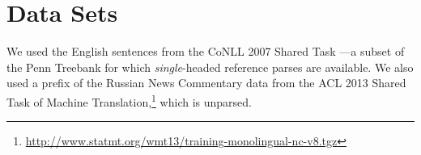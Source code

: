 \documentclass[a4paper,11pt]{article}
\newcommand{\Note}[4][]{\todo[author=#2,color=#3,fancyline,#1]{#4}}
\newcommand{\noteJE}[2][]{\Note[size=\small,#1]{JE}{green!40}{#2}}
\newcommand{\NoteJE}[2][]{\noteJE[inline,#1]{#2}}
\begin{document}




\section{Data Sets}
We used the English sentences from the CoNLL 2007 Shared Task \cite{CONLL-SHARED-2007}---a subset of the Penn Treebank for which {\em single}-headed reference parses are available. 
We also used a prefix of the Russian News Commentary data from the ACL 2013 Shared Task of Machine Translation,\footnote{\url{http://www.statmt.org/wmt13/training-monolingual-nc-v8.tgz}} which is unparsed.
\end{document}
